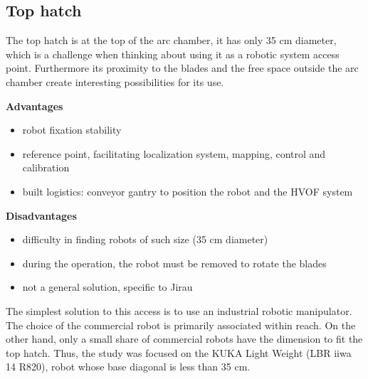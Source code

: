 \subsection{Top hatch}
The top hatch is at the top of the arc chamber, it has only 35 cm diameter,
which is a challenge when thinking about using it as a robotic system access
point. Furthermore its proximity to the blades and the free space outside the
arc chamber create interesting possibilities for its use.

\textbf{Advantages}
\begin{itemize}
  \item robot fixation stability
  \item reference point, facilitating localization system, mapping, control and
  calibration
  \item built logistics: conveyor gantry to position the robot and the
  HVOF system
\end{itemize}

\textbf{Disadvantages}
\begin{itemize}
  \item difficulty in finding robots of such size (35 cm diameter)
  \item during the operation, the robot must be
  removed to rotate the blades
  \item not a general solution, specific to Jirau
\end{itemize}

The simplest solution to this access is to use an industrial robotic manipulator.
The choice of the commercial robot is primarily associated within reach. On the
other hand, only a small share of commercial robots have the dimension to fit
the top hatch. Thus, the study was focused on the KUKA Light Weight (LBR
iiwa 14 R820), robot whose base diagonal is less than 35 cm.



